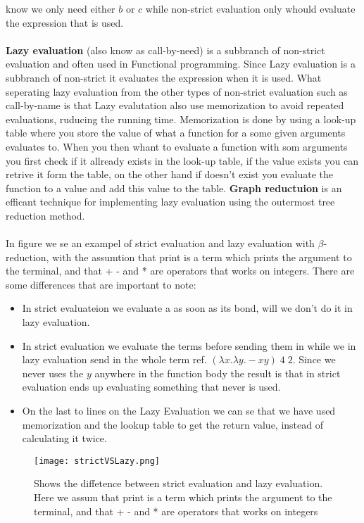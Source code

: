 know we only need either $b$ or $c$ while non-strict evaluation only whould evaluate the expression that is used.
\\ \\
\textbf{Lazy evaluation} (also know as call-by-need) is a subbranch 
of non-strict evaluation and often used in Functional programming. Since Lazy evaluation is a subbranch of non-strict it evaluates 
the expression when it is used. What seperating lazy evaluation from the other types of non-strict evaluation such as call-by-name
is that Lazy evalutation also use memorization to avoid repeated evaluations, ruducing the running time. Memorization is done by using a 
look-up table where you store the value of what a function for a some given arguments evaluates to. When you then whant to evaluate a 
function with som arguments you first check if it allready exists in the look-up table, if the value exists you can retrive it form the table, on the 
other hand if doesn't exist you evaluate the function to a value and add this value to the table.
\textbf{Graph reductuion} is an efficant technique for implementing lazy evaluation using the outermost tree reduction method.
\\ \\
In figure  we se an exampel of strict evaluation and lazy evaluation with $\beta$-reduction, with the 
assumtion that print is a term which prints the argument to the terminal, and that + - and * are operators that works on integers.
There are some differences that are important to note:

\begin{itemize}
    \item In strict evaluateion we evaluate a as soon as its bond, will we don't do it in lazy evaluation.
    \item In strict evaluation we evaluate the terms before sending them in while we in lazy evaluation send in the whole term
    ref. $(\lambda x.\lambda y. - x y)\; 4 \; 2$. Since we never uses the $y$ anywhere in the function body the result is that 
    in strict evaluation ends up evaluating something that never is used.
    \item On the last to lines on the Lazy Evaluation we can se that we have used memorization and the lookup table to get
    the return value, instead of calculating it twice.
\end{itemize}

\begin{figure}
    \centering
    \texttt{[image: strictVSLazy.png]}
    \caption{Shows the diffetence between strict evaluation and lazy evaluation. Here we assum that print is a term which 
    prints the argument to the terminal, and that + - and * are operators that works on integers}
    \label{fig:strictVSLazy}
\end{figure}

